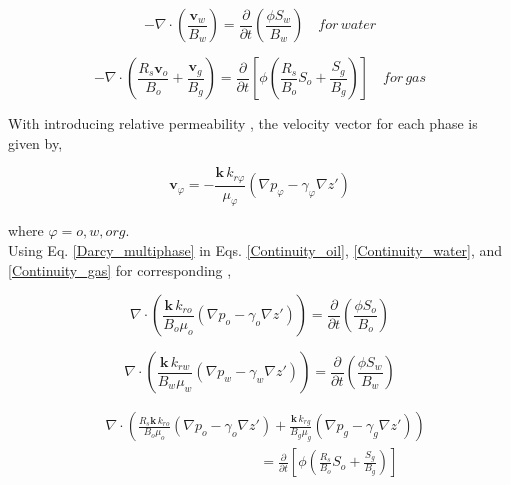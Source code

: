 \documentclass{llncs}
\numberwithin{equation}{section}
\numberwithin{figure}{section}
\numberwithin{table}{section}
\begin{document}
    \begin{equation}
    -\nabla \cdot \left( \frac{\mathbf{v}_{w}}{{{B}_{w}}} \right)=\frac{\partial }{\partial t}\left( \frac{\phi {{S}_{w}}}{{{B}_{w}}} \right)\quad for\,water
    \label{Continuity_water}
    \end{equation}

    \begin{equation}
    -\nabla \cdot \left( \frac{{{R}_{s}}{{\mathbf{v}}_{o}}}{{{B}_{o}}}+\frac{{{\mathbf{v}}_{g}}}{{{B}_{g}}} \right)=\frac{\partial }{\partial t}\left[ \phi \left( \frac{{{R}_{s}}}{{{B}_{o}}}{{S}_{o}}+\frac{{{S}_{g}}}{{{B}_{g}}} \right) \right]\quad for\,gas
    \label{Continuity_gas}
    \end{equation}

    With introducing relative permeability , the velocity vector for each phase is given by,

    \begin{equation}
    {{\mathbf{v}}_{\varphi}}=-\frac{\mathbf{k}\,{{k}_{r\varphi}}}{{{\mu }_{\varphi}}}\left( \nabla {{p}_{\varphi}}-{{\gamma }_{\varphi}}\nabla z' \right)
    \label{Darcy_multiphase}
    \end{equation}

    where $\varphi = o, w, or g$.\\

    Using Eq. \ref{Darcy_multiphase} in Eqs. \ref{Continuity_oil}, \ref{Continuity_water}, and \ref{Continuity_gas} for corresponding ,

    \begin{equation}
    \nabla \cdot \left( \frac{\mathbf{k}\,{{k}_{ro}}}{{{B}_{o}}{{\mu }_{o}}}\left( \nabla {{p}_{o}}-{{\gamma }_{o}}\nabla z' \right) \right)=\frac{\partial }{\partial t}\left( \frac{\phi {{S}_{o}}}{{{B}_{o}}} \right)
    \label{Continuity_oil_Darcy}
    \end{equation}

    \begin{equation}
    \nabla \cdot \left( \frac{\mathbf{k}\,{{k}_{rw}}}{{{B}_{w}}{{\mu }_{w}}}\left( \nabla {{p}_{w}}-{{\gamma }_{w}}\nabla z' \right) \right)=\frac{\partial }{\partial t}\left( \frac{\phi {{S}_{w}}}{{{B}_{w}}} \right)
    \label{Continuity_water_Darcy}
    \end{equation}

    \begin{equation}
    \begin{split}
    & \nabla \cdot \left( \frac{{{R}_{s}}\mathbf{k}\,{{k}_{ro}}}{{{B}_{o}}{{\mu }_{o}}}\left( \nabla {{p}_{o}}-{{\gamma }_{o}}\nabla z' \right)+\frac{\mathbf{k}\,{{k}_{rg}}}{{{B}_{g}}{{\mu }_{g}}}\left( \nabla {{p}_{g}}-{{\gamma }_{g}}\nabla z' \right) \right) \\
    & \quad \quad \quad \quad \quad \quad \quad \quad \quad \quad \quad =\frac{\partial }{\partial t}\left[ \phi \left( \frac{{{R}_{s}}}{{{B}_{o}}}{{S}_{o}}+\frac{{{S}_{g}}}{{{B}_{g}}} \right) \right] \\
    \end{split}
    \label{Continuity_gas_Darcy}
    \end{equation}
\end{document}
